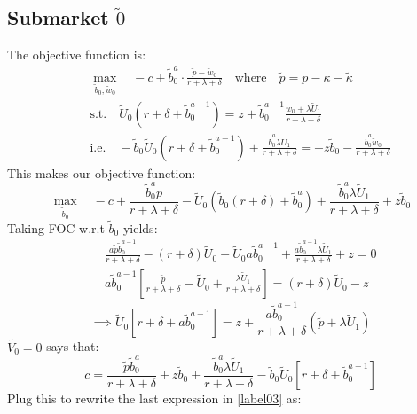 \documentclass[12pt]{article} %
\theoremstyle{definition}
\begin{document}
\subsection{Submarket $\tilde{0}$}
The objective function is: 
\begin{eqnarray*}
&& \max_{\tilde{b}_0,\tilde{w}_0} \quad -c + \tilde{b}_0^a \cdot \frac{\tilde{p}-\tilde{w}_0}{r+\lambda+\delta} \quad \text{where} \quad \tilde{p}=p-\kappa-\tilde{\kappa}\\
&& \text{s.t.} \quad \tilde{U}_0(r+\delta+\tilde{b}_0^{a-1}) = z + \tilde{b}_0^{a-1} \frac{\tilde{w}_0+\lambda \tilde{U}_1}{r+\lambda+\delta} \\
&& \text{i.e.} \quad -\tilde{b}_0 \tilde{U}_0(r+\delta+\tilde{b}_0^{a-1}) + \frac{\tilde{b}_0^{a} \lambda \tilde{U}_1}{r+\lambda+\delta}  = -z\tilde{b}_0 -  \frac{\tilde{b}_0^{a}\tilde{w}_0}{r+\lambda+\delta} 
\end{eqnarray*}
This makes our objective function: 
\begin{equation*}
\max_{\tilde{b}_0} \quad -c + \frac{\tilde{b}_0^a p}{r+\lambda+\delta} - \tilde{U}_0(\tilde{b}_0(r+
\delta)+\tilde{b}_0^a) + \frac{\tilde{b}_0^{a} \lambda \tilde{U}_1}{r+\lambda+\delta} +  z\tilde{b}_0
\end{equation*}
Taking FOC w.r.t $\tilde{b}_0$ yields: 
\begin{eqnarray*}
&& \frac{a \tilde{p} \tilde{b}_0^{a-1}}{r+\lambda+\delta} - (r+\delta) \tilde{U}_0 - \tilde{U}_0 a \tilde{b}_0^{a-1} + \frac{a\tilde{b}_0^{a-1} \lambda \tilde{U}_1}{r+\lambda+\delta}+z= 0 \\
&& a\tilde{b}_0^{a-1} \left[\frac{\tilde{p}}{r+\lambda+\delta} - \tilde{U}_0 +\frac{\lambda \tilde{U}_1}{r+\lambda+\delta}\right] = (r+\delta)\tilde{U}_0 - z
\end{eqnarray*}
\begin{equation}
 \implies \tilde{U}_0[r+\delta+a\tilde{b}_0^{a-1}] = z + \frac{a \tilde{b}_0^{a-1}}{r+\lambda+\delta}(\tilde{p}+\lambda \tilde{U}_1) \label{label03}\tag{***}
\end{equation}
$\tilde{V_0}=0$ says that:
\begin{equation*}
 c = \frac{\tilde{p} \tilde{b}_0^{a}}{r+\lambda+\delta} + z \tilde{b}_0 + \frac{\tilde{b}_0^{a}\lambda \tilde{U}_1}{r+\lambda+\delta} -\tilde{b}_0\tilde{U}_0[r+\delta+\tilde{b}_0^{a-1}]
\end{equation*}
Plug this to rewrite the last expression in \ref{label03} as: 
\end{document}
